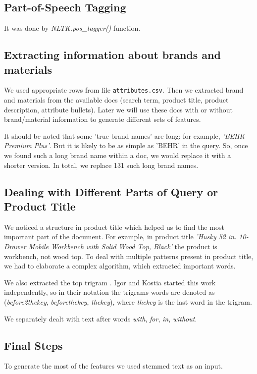 \documentclass[12pt]{article}
\begin{document}
{{\subsection{Part-of-Speech Tagging}
It was done by \emph{NLTK.pos\_tagger()} function.

\subsection{Extracting information about brands and materials}
We used appropriate rows from file \texttt{attributes.csv}. Then we extracted brand and materials from the available docs (search term, product title, product description, attribute bullets). Later we will use these docs with or without brand/material information to generate different sets of features.

It should be noted that some 'true brand names' are long: for example, \emph{'BEHR Premium Plus'}. But it is likely to be as simple as 'BEHR' in the query. So, once we found such a long brand name within a doc, we would replace it with a shorter version. In total, we replace 131 such long brand names.

\subsection{Dealing with Different Parts of Query or Product Title}
We noticed a structure in product title which helped us to find the most important part of the document. For example, in product title \emph{'Husky 52 in. 10-Drawer Mobile Workbench with Solid Wood Top, Black'} the product is workbench, not wood top. To deal with multiple patterns present in product title, we had to elaborate a complex algorithm, which extracted important words.

We also extracted the top trigram \cite{crowdflower_3place}. Igor and Kostia started this work independently, so in their notation the trigrams words are denoted as (\emph{before2thekey}, \emph{beforethekey}, \emph{thekey}), where \emph{thekey} is the last word in the trigram.

We separately dealt with text after words \emph{with}, \emph{for}, \emph{in}, \emph{without}.

\subsection{Final Steps}
To generate the most of the features we used stemmed text as an input.

}}
\end{document}
